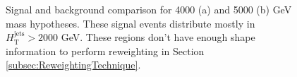 \begin{figure}[H]
    \caption{Signal and background comparison for 4000 (a) and 5000 (b) GeV mass hypotheses. These signal events distribute mostly in $H_{\text{T}}^{\text{jets}}>2000$ GeV. These regions don't have enough shape information to perform reweighting in Section \ref{subsec:ReweightingTechnique}.}
    \label{fig:SOVERB_HT_jets_4and5TeV}
\end{figure}

